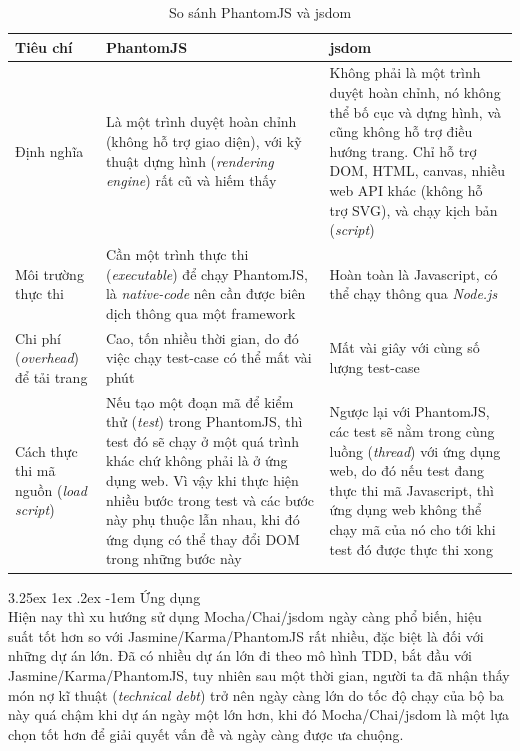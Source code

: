 \documentclass[12pt,a4paper]{article}
\makeatletter
\newcommand{\myparagraph}[1]{\paragraph{#1}\mbox{}\\} %
\renewcommand\paragraph{\@startsection{paragraph}{5}{\z@}%
  {3.25ex \@plus1ex \@minus.2ex}%
  {-1em}%
  {\normalfont\normalsize\bfseries}}
\makeatother
\begin{document}
\begin{table}
\caption{So sánh PhantomJS và jsdom}
\begin{tabu} to 1\textwidth { | X[l] | X[l] | X[l] | }
\hline
\textbf{Tiêu chí} & \textbf{PhantomJS} & \textbf{jsdom}\\
\hline\hline
Định nghĩa & Là một trình duyệt hoàn chỉnh (không hỗ trợ giao diện), với kỹ thuật dựng hình (\textit{rendering engine}) rất cũ và hiếm thấy & Không phải là một trình duyệt hoàn chỉnh, nó không thể bố cục và dựng hình, và cũng không hỗ trợ điều hướng trang. Chỉ hỗ trợ DOM, HTML, canvas, nhiều web API khác (không hỗ trợ SVG), và chạy kịch bản (\textit{script})\\
\hline
Môi trường thực thi & Cần một trình thực thi (\textit{executable}) để chạy PhantomJS, là \textit{native-code} nên cần được biên dịch thông qua một framework & Hoàn toàn là Javascript, có thể chạy thông qua \textit{Node.js} \\
\hline
Chi phí (\textit{overhead}) để tải trang & Cao, tốn nhiều thời gian, do đó việc chạy test-case có thể mất vài phút & Mất vài giây với cùng số lượng test-case \\
\hline
Cách thực thi mã nguồn (\textit{load script}) & Nếu tạo một đoạn mã  để kiểm thử (\textit{test}) trong PhantomJS, thì test đó sẽ chạy ở một quá trình khác chứ không phải là ở ứng dụng web. Vì vậy khi thực hiện nhiều bước trong test và các bước này phụ thuộc lẫn nhau, khi đó ứng dụng có thể thay đổi DOM trong những bước này & Ngược lại với PhantomJS, các test sẽ nằm trong cùng luồng (\textit{thread}) với ứng dụng web, do đó nếu test đang thực thi mã Javascript, thì ứng dụng web không thể chạy mã của nó cho tới khi test đó được thực thi xong\\
\hline
\end{tabu}
\label{table:phantomjs_jsdom}
\end{table}

\myparagraph{Ứng dụng}
Hiện nay thì xu hướng sử dụng Mocha/Chai/jsdom ngày càng phổ biến, hiệu suất tốt hơn so với Jasmine/Karma/PhantomJS rất nhiều, đặc biệt là đối với những dự án lớn. Đã có nhiều dự án lớn đi theo mô hình TDD, bắt đầu với Jasmine/Karma/PhantomJS, tuy nhiên sau một thời gian, người ta đã nhận thấy món nợ kĩ thuật (\textit{technical debt}) trở nên ngày càng lớn do tốc độ chạy của bộ ba này quá chậm khi dự án ngày một lớn hơn, khi đó Mocha/Chai/jsdom là một lựa chọn tốt hơn để giải quyết vấn đề và ngày càng được ưa chuộng.
\end{document}
